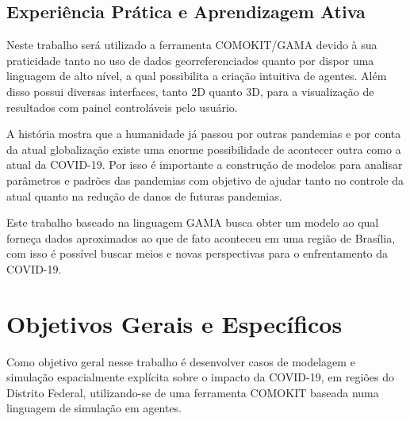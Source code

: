 \subsection{Experiência Prática e Aprendizagem Ativa}

Neste trabalho será utilizado a ferramenta COMOKIT/GAMA devido à sua praticidade tanto no uso de dados georreferenciados quanto por dispor uma linguagem de alto nível, a qual possibilita a criação intuitiva de agentes. Além disso possui diversas interfaces, tanto 2D quanto 3D, para a visualização de resultados com painel controláveis pelo usuário.

A história mostra que a humanidade já passou por outras pandemias e por conta da atual globalização existe uma enorme possibilidade de acontecer outra como a atual da COVID-19. Por isso é importante a construção de modelos para analisar parâmetros e padrões das pandemias com objetivo de ajudar tanto no controle da atual quanto na redução de danos de futuras pandemias. 

Este trabalho baseado na linguagem GAMA busca obter um modelo ao qual forneça dados aproximados ao que de fato aconteceu em uma região de Brasília, com isso é possível buscar meios e novas perspectivas para o enfrentamento da COVID-19.




\section{Objetivos Gerais e Específicos}%

Como objetivo geral nesse trabalho é desenvolver casos de modelagem e simulação espacialmente explícita sobre o impacto da COVID-19, em regiões do Distrito Federal, utilizando-se de uma ferramenta COMOKIT baseada numa linguagem de simulação  em agentes.

